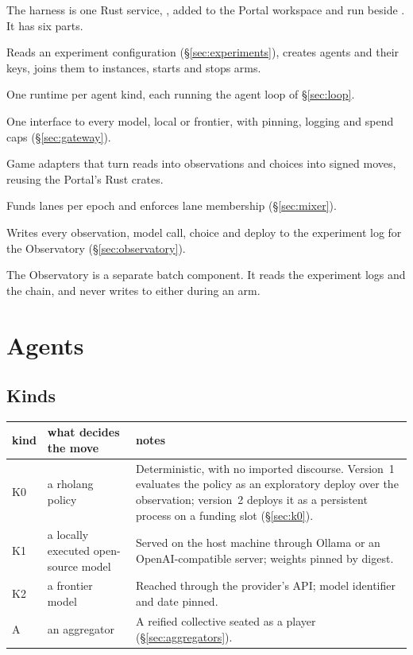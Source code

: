 \documentclass[11pt,a4paper]{article}
\begin{document}
The harness is one Rust service, , added to the Portal workspace and run
beside . It has six parts.

\begin{description}[leftmargin=1.2em,itemsep=3pt,font=\normalfont\spartansemi]
\item[Population manager.] Reads an experiment configuration (\S\ref{sec:experiments}), creates
  agents and their keys, joins them to instances, starts and stops arms.
\item[Agent runtimes.] One runtime per agent kind, each running the agent loop of
  \S\ref{sec:loop}.
\item[Model gateway.] One interface to every model, local or frontier, with pinning, logging and
  spend caps (\S\ref{sec:gateway}).
\item[Perception and action.] Game adapters that turn reads into observations and choices into
  signed moves, reusing the Portal's Rust crates.
\item[Mixer.] Funds lanes per epoch and enforces lane membership (\S\ref{sec:mixer}).
\item[Recorder.] Writes every observation, model call, choice and deploy to the experiment log for
  the Observatory (\S\ref{sec:observatory}).
\end{description}

The Observatory is a separate batch component. It reads the experiment logs and the chain, and
never writes to either during an arm.

\section{Agents}\label{sec:agents}

\subsection{Kinds}

\begin{center}\small
\begin{tabularx}{\linewidth}{@{}l>{\raggedright\arraybackslash}p{36mm}X@{}}
\toprule
kind & what decides the move & notes \\
\midrule
K0 & a rholang policy & Deterministic, with no imported discourse. Version~1 evaluates the policy
  as an exploratory deploy over the observation; version~2 deploys it as a persistent process on a
  funding slot (\S\ref{sec:k0}).\\
K1 & a locally executed open-source model & Served on the host machine through Ollama or an
  OpenAI-compatible server; weights pinned by digest.\\
K2 & a frontier model & Reached through the provider's API; model identifier and date pinned.\\
A & an aggregator & A reified collective seated as a player (\S\ref{sec:aggregators}).\\
\bottomrule
\end{tabularx}
\end{center}
\end{document}
